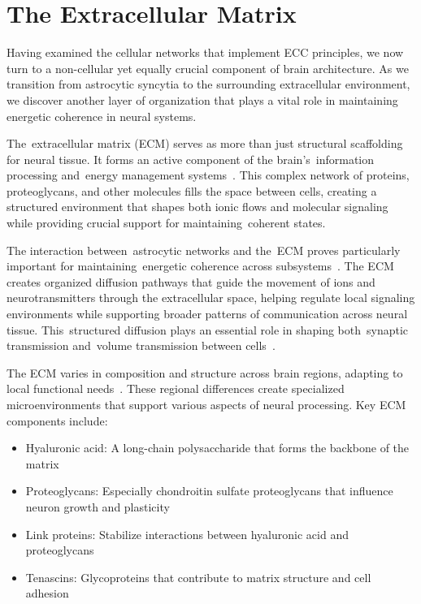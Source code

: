 \section{The Extracellular Matrix~}

Having examined the cellular networks that implement ECC principles, we now turn to a non-cellular yet equally crucial component of brain architecture. As we transition from astrocytic syncytia to the surrounding extracellular environment, we discover another layer of organization that plays a vital role in maintaining energetic coherence in neural systems.

The~extracellular matrix (ECM) serves as more than just structural scaffolding for neural tissue. It forms an active component of the brain's~information processing and~energy management systems~\cite{Dityatev2010, Barker2018}. This complex network of proteins, proteoglycans, and other molecules fills the space between cells, creating a structured environment that shapes both ionic flows and molecular signaling while providing crucial support for maintaining~coherent states.

The interaction between~astrocytic networks and the~ECM proves particularly important for maintaining~energetic coherence across subsystems~\cite{Song2018, Verkhratsky2018}. The ECM creates organized diffusion pathways that guide the movement of ions and neurotransmitters through the extracellular space, helping regulate local signaling environments while supporting broader patterns of communication across neural tissue. This~structured diffusion plays an essential role in shaping both~synaptic transmission and~volume transmission between cells~\cite{Sykova2008, Vargova2014}.

The ECM varies in composition and structure across brain regions, adapting to local functional needs~\cite{Bandtlow2000, Zimmermann2008}. These regional differences create specialized microenvironments that support various aspects of neural processing. Key ECM components include:

\begin{itemize}
  \item Hyaluronic acid: A long-chain polysaccharide that forms the backbone of the matrix
  \item Proteoglycans: Especially chondroitin sulfate proteoglycans that influence neuron growth and plasticity
  \item Link proteins: Stabilize interactions between hyaluronic acid and proteoglycans
  \item Tenascins: Glycoproteins that contribute to matrix structure and cell adhesion
\end{itemize}

